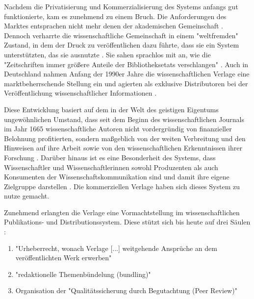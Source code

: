 Nachdem die Privatisierung und Kommerzialisierung des Systems anfangs gut funktionierte, kam es zunehmend zu einem Bruch. Die Anforderungen des Marktes entsprachen nicht mehr denen der akademischen Gemeinschaft \cite{Weiner_2001}. Dennoch verharrte die wissenschaftliche Gemeinschaft in einem "weltfremden" Zustand, in dem der Druck zu veröffentlichen dazu führte, dass sie ein System unterstützten, das sie ausnutzte \cite{Weiner_2001}. Sie sahen sprachlos mit an, wie die "Zeitschriften immer größere Anteile der Bibliotheksetats verschlangen" \cite{Hagner_2015}. Auch in Deutschland nahmen Anfang der 1990er Jahre die wissenschaftlichen Verlage eine marktbeherrschende Stellung ein und agierten als exklusive Distributoren bei der Veröffentlichung wissenschaftlicher Informationen \cite{Schloegl_2005} \cite{Offhaus_2012}.

Diese Entwicklung basiert auf dem in der Welt des geistigen Eigentums ungewöhnlichen Umstand, dass seit dem Beginn des wissenschaftlichen Journals im Jahr 1665 wissenschaftliche Autoren nicht vordergründig von finanzieller Belohnung profitierten, sondern maßgeblich von der weiten Verbreitung und den Hinweisen auf ihre Arbeit sowie von den wissenschaftlichen Erkenntnissen ihrer Forschung \cite{Albert_2006}. Darüber hinaus ist es eine Besonderheit des Systems, dass Wissenschaftler und Wissenschaftlerinnen sowohl Produzenten als auch Konsumenten der Wissenschaftskommunikation sind und damit ihre eigene Zielgruppe darstellen \cite{Hess_2006}. Die kommerziellen Verlage haben sich dieses System zu nutze gemacht.

Zunehmend erlangten die Verlage eine Vormachtstellung im wissenschaftlichen Publikations- und Distributionssystem. Diese stützt sich bis heute auf drei Säulen \cite{Offhaus_2012} \cite{Bargheer_2006}:
\begin{enumerate}
\item "Urheberrecht, wonach Verlage [...] weitgehende Ansprüche an dem veröffentlichten Werk erwerben"
\item "redaktionelle Themenbündelung (bundling)"
\item Organisation der "Qualitätssicherung durch Begutachtung (Peer Review)"
\end{enumerate}


